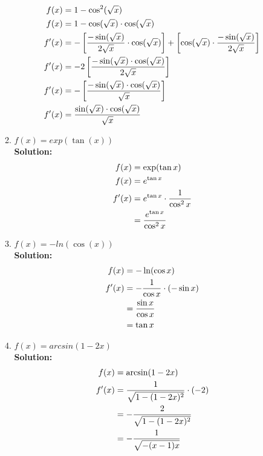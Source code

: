 \documentclass[a4paper]{article}
\begin{document}
\begin{enumerate}
\begin{enumerate}
\begin{align}
	f(x) &= 1 - \cos^2 (\sqrt{x})\notag\\
	f(x) &= 1 - \cos(\sqrt{x}) \cdot \cos(\sqrt{x})\notag\\
	f'(x) &=  - \left[  \frac{-\sin(\sqrt{x})}{2\sqrt{x}} \cdot \cos(\sqrt{x})\right] + \left[ \cos(\sqrt{x}) \cdot \frac{-\sin(\sqrt{x})}{2\sqrt{x}}\right]\notag\\
	f'(x) &= - 2\left[ \frac{- \sin(\sqrt{x}) \cdot \cos(\sqrt{x})}{2\sqrt{x}}\right]\notag\\
	f'(x) &= - \left[ \frac{- \sin(\sqrt{x}) \cdot \cos(\sqrt{x})}{\sqrt{x}}\right]\notag\\
	f'(x) &=   \frac{ \sin(\sqrt{x}) \cdot \cos(\sqrt{x})}{\sqrt{x}}\notag
\end{align}		
	
	
	\item $f(x) = exp(\tan(x))$\\
	\textbf{Solution:}\\
	
	
\begin{align*}
 f(x) &= \exp(\tan x)\notag\\
 f(x) &= e^{\tan x}\notag\\
 f'(x) &= e^{\tan x} \cdot \frac{1}{\cos^2 x}\notag\\
 &= \frac{e^{\tan x}}{\cos^2 x}\notag
\end{align*}	
	
	\item $f(x) = -ln(\cos(x))$\\
	\textbf{Solution:}\\
	
	
\begin{align*}
	f(x) &= - \ln(\cos x)\notag\\
	f'(x) &= - \frac{1}{\cos x} \cdot (- \sin x)\notag\\
	&= \frac{\sin x}{\cos x}\notag\\
	&= \tan x\notag
\end{align*}	
	
	
	\item $f(x) = arcsin(1 - 2x)$\\
	\textbf{Solution:}\\
	
	
\begin{align*}
	f(x) &= \arcsin(1 - 2x)\notag\\
	f'(x) &= \frac{1}{\sqrt{1 - (1 - 2x)^2}} \cdot (-2)\notag\\
	&= - \frac{2}{\sqrt{1 - (1 - 2x)^2}}\notag\\
	&= -\frac{1}{\sqrt{-(x-1)x}}\notag
\end{align*}	
	

\end{enumerate}
\end{enumerate}
\end{document}

